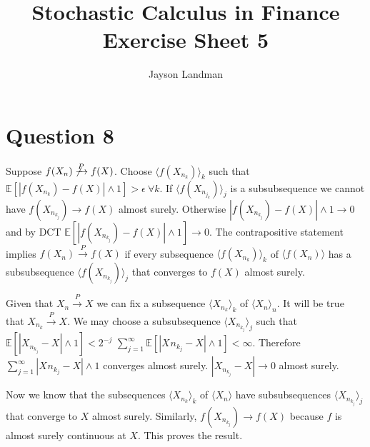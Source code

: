 \documentclass[12pt, letterpaper]{article}
\title{Stochastic Calculus in Finance\\
		\large Exercise Sheet 5}
\author{Jayson Landman}
\begin{document}
	\section*{Question 8}
	 
	 Suppose $f(X_n) \not \xrightarrow{P} f(X)$. \newline Choose $\langle f(X_{n_k})\rangle_k$ such that $\mathbb{E}[|f(X_{n_k}) - f(X)|\wedge 1] > \epsilon \: \forall k$. \newline
	If $\langle f(X_{n_{j_k}}) \rangle_j$ is a subsubsequence we cannot have $f(X_{n_{k_j}}) \rightarrow f(X)$ almost surely. \newline
	Otherwise $|f(X_{n_{k_j}}) - f(X)| \wedge 1 \rightarrow 0$ and by DCT $\mathbb{E}[|f(X_{n_{k_j}}) - f(X)| \wedge 1] \rightarrow 0$. \newline
	The contrapositive statement implies $f(X_n) \xrightarrow{P} f(X)$ if every subsequence $\langle f(X_{n_k}) \rangle_k$ of $\langle f(X_n) \rangle$ has a subsubsequence $\langle f(X_{n_{k_j}}) \rangle_j$ that converges to $f(X)$ almost surely.
	 
	Given that $X_n \xrightarrow{P} X$ we can fix a subsequence $\langle X_{n_k} \rangle_{k}$ of $\langle X_n \rangle_n$. \newline
	It will be true that $X_{n_k} \xrightarrow{P} X$. \newline 
	We may choose a subsubsequence $\langle X_{n_{k_j}} \rangle_j$ such that $\mathbb{E}[|X_{n_{k_j}} - X|\wedge 1] < 2^{-j}$ \newline
	$\sum^\infty_{j =1}\mathbb{E}[|X_{}n_{k_j} - X|\wedge 1] < \infty$. Therefore $\sum^\infty_{j =1}|X_{}n_{k_j} - X|\wedge 1$ converges almost surely. \newline
	$|X_{n_{k_j}} - X| \rightarrow 0$ almost surely.
	
	 
	Now we know that the subsequences $\langle X_{n_k} \rangle_k$ of $\langle X_n \rangle$ have subsubsequences $\langle X_{n_{k_j}} \rangle_j$ that converge to $X$ almost surely. Similarly, $f(X_{n_{k_j}}) \rightarrow f(X)$ because $f$ is almost surely continuous at $X$. This proves the result.
\end{document}
